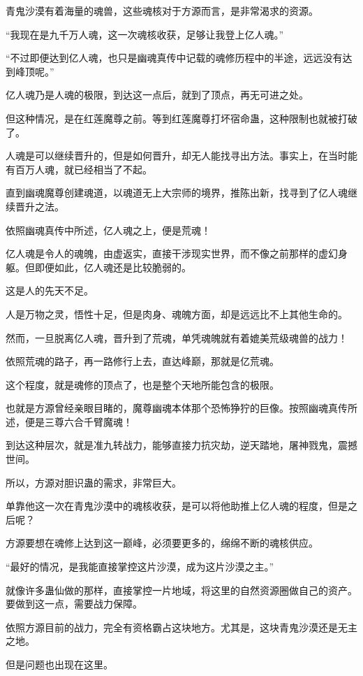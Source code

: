 \begin{this_body}
青鬼沙漠有着海量的魂兽，这些魂核对于方源而言，是非常渴求的资源。

“我现在是九千万人魂，这一次魂核收获，足够让我登上亿人魂。”

“不过即便达到亿人魂，也只是幽魂真传中记载的魂修历程中的半途，远远没有达到峰顶呢。”

亿人魂乃是人魂的极限，到达这一点后，就到了顶点，再无可进之处。

但这种情况，是在红莲魔尊之前。等到红莲魔尊打坏宿命蛊，这种限制也就被打破了。

人魂是可以继续晋升的，但是如何晋升，却无人能找寻出方法。事实上，在当时能有百万人魂，就已经相当了不起。

直到幽魂魔尊创建魂道，以魂道无上大宗师的境界，推陈出新，找寻到了亿人魂继续晋升之法。

依照幽魂真传中所述，亿人魂之上，便是荒魂！

亿人魂是令人的魂魄，由虚返实，直接干涉现实世界，而不像之前那样的虚幻身躯。但即便如此，亿人魂还是比较脆弱的。

这是人的先天不足。

人是万物之灵，悟性十足，但是肉身、魂魄方面，却是远远比不上其他生命的。

然而，一旦脱离亿人魂，晋升到了荒魂，单凭魂魄就有着媲美荒级魂兽的战力！

依照荒魂的路子，再一路修行上去，直达峰巅，那就是亿荒魂。

这个程度，就是魂修的顶点了，也是整个天地所能包含的极限。

也就是方源曾经亲眼目睹的，魔尊幽魂本体那个恐怖狰狞的巨像。按照幽魂真传所述，便是三尊六合千臂魔魂！

到达这种层次，就是准九转战力，能够直接力抗灾劫，逆天踏地，屠神戮鬼，震撼世间。

所以，方源对胆识蛊的需求，非常巨大。

单靠他这一次在青鬼沙漠中的魂核收获，是可以将他助推上亿人魂的程度，但是之后呢？

方源要想在魂修上达到这一巅峰，必须要更多的，绵绵不断的魂核供应。

“最好的情况，是我能直接掌控这片沙漠，成为这片沙漠之主。”

就像许多蛊仙做的那样，直接掌控一片地域，将这里的自然资源圈做自己的资产。要做到这一点，需要战力保障。

依照方源目前的战力，完全有资格霸占这块地方。尤其是，这块青鬼沙漠还是无主之地。

但是问题也出现在这里。


\end{this_body}
